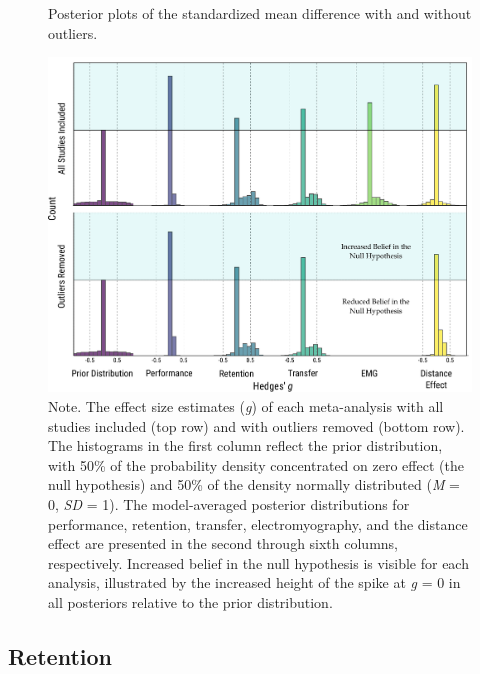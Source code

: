 \documentclass[man,floatsintext,letterpaper,12pt]{apa7}
\begin{document}
\begin{figure}[htbp]
    \caption{Posterior plots of the standardized mean difference with and without outliers.}
    \centering
    \includegraphics[scale=0.55]{../../figs/fig1.pdf}
    \setlength{\belowcaptionskip}{-2em}
    \caption*{\singlespacing \small Note. \normalfont The effect size estimates (\emph{g}) of each meta-analysis with all studies included (top row) and with outliers removed (bottom row). The histograms in the first column reflect the prior distribution, with 50\% of the probability density concentrated on zero effect (the null hypothesis) and 50\% of the density normally distributed (\emph{M} = 0, \emph{SD} = 1). The model-averaged posterior distributions for performance, retention, transfer, electromyography, and the distance effect are presented in the second through sixth columns, respectively. Increased belief in the null hypothesis is visible for each analysis, illustrated by the increased height of the spike at \emph{g} = 0 in all posteriors relative to the prior distribution.}
    \label{fig:fig1}
\end{figure}

\clearpage

\subsection{Retention}
\end{document}
